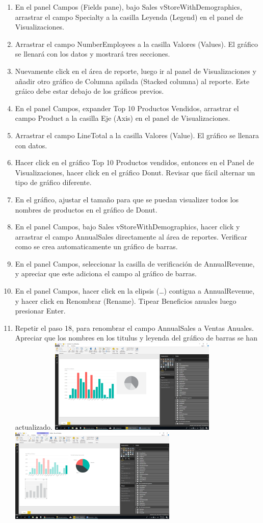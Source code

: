\begin{itemize}
\begin{enumerate}
\item En el panel Campos (Fields pane), bajo Sales vStoreWithDemographics, arrastrar el campo Specialty a la
casilla Leyenda (Legend) en el panel de Visualizaciones.
\item  Arrastrar el campo NumberEmployees a la casilla Valores (Values). El gráfico se llenará con los datos y
mostrará tres secciones.
\item  Nuevamente click en el área de reporte, luego ir al panel de Visualizaciones y añadir otro gráfico de
Columna apilada (Stacked columna) al reporte. Este gráico debe estar debajo de los gráficos previos.
\item  En el panel Campos, expander Top 10 Productos Vendidos, arrastrar el campo Product a la casilla Eje (Axis)
en el panel de Visualizaciones.
\item  Arrastrar el campo LineTotal a la casilla Valores (Value). El gráfico se llenara con datos.
\item  Hacer click en el gráfico Top 10 Productos vendidos, entonces en el Panel de Visualizaciones, hacer click en
el gráfico Donut. Revisar que fácil alternar un tipo de gráfico diferente.
\item  En el gráfico, ajustar el tamaño para que se puedan visualizer todos los nombres de productos en el gráfico
de Donut.
\item  En el panel Campos, bajo Sales vStoreWithDemographics, hacer click y arrastrar el campo AnnualSales
directamente al área de reportes. Verificar como se crea automaticamente un gráfico de barras. 
\item En el panel Campos, seleccionar la casilla de verificación de AnnualRevenue, y apreciar que este adiciona el
campo al gráfico de barras.
\item En el panel Campos, hacer click en la elipsis (…) contigua a AnnualRevenue, y hacer click en Renombrar
(Rename). Tipear Beneficios anuales luego presionar Enter.
\item Repetir el paso 18, para renombrar el campo AnnualSales a Ventas Anuales. Apreciar que los nombres en
los titulus y leyenda del gráfico de barras se han actualizado. 
\includegraphics[width=8cm]{./Imagenes/12.png} \includegraphics[width=8cm]{./Imagenes/13.png}

\end{enumerate}
\end{itemize}
